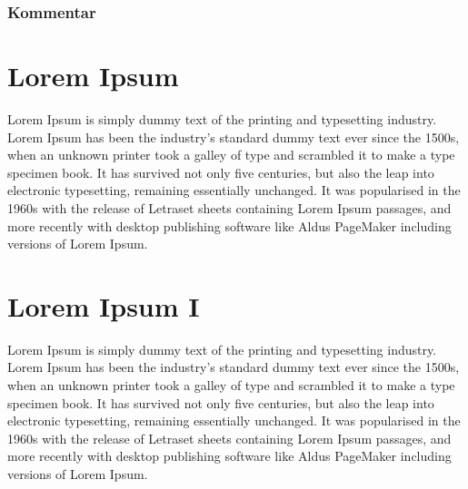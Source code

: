 \subsubsection{Kommentar}

\kommentarfeld[25]

\tickbox[Tickbox]



\newpage 
\section{Lorem Ipsum}
Lorem Ipsum is simply dummy text of the printing and typesetting industry. 
Lorem Ipsum has been the industry's standard dummy text ever since the 1500s, 
when an unknown printer took a galley of type and scrambled it to make a type 
specimen book. It has survived not only five centuries, but also the leap into 
electronic typesetting, remaining essentially unchanged. It was popularised in 
the 1960s with the release of Letraset sheets containing Lorem Ipsum passages, 
and more recently with desktop publishing software like Aldus PageMaker 
including versions of Lorem Ipsum.
\newpage 
\section{Lorem Ipsum I}
Lorem Ipsum is simply dummy text of the printing and typesetting industry. 
Lorem Ipsum has been the industry's standard dummy text ever since the 1500s, 
when an unknown printer took a galley of type and scrambled it to make a type 
specimen book. It has survived not only five centuries, but also the leap into 
electronic typesetting, remaining essentially unchanged. It was popularised in 
the 1960s with the release of Letraset sheets containing Lorem Ipsum passages, 
and more recently with desktop publishing software like Aldus PageMaker 
including versions of Lorem Ipsum.





